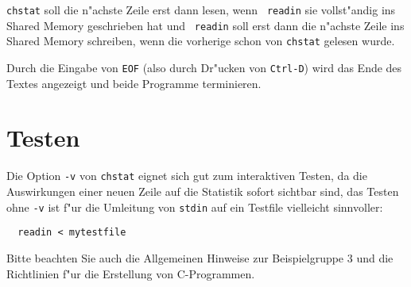 \documentclass{article}
\begin{document}
{\tt chstat} soll die n"achste Zeile erst dann lesen, wenn {\tt
readin} sie vollst"andig ins Shared Memory geschrieben hat und {\tt
readin} soll erst dann die n"achste Zeile ins Shared Memory schreiben,
wenn die vorherige schon von {\tt chstat} gelesen wurde.

Durch die Eingabe von {\tt EOF} (also durch Dr"ucken von {\tt Ctrl-D})
wird das Ende des Textes angezeigt und beide Programme terminieren.



\section*{Testen}

Die Option {\tt -v} von {\tt chstat} eignet sich gut zum interaktiven
Testen, da die Auswirkungen einer neuen Zeile auf die Statistik sofort
sichtbar sind, das Testen ohne {\tt -v} ist f"ur die Umleitung von
{\tt stdin} auf ein Testfile vielleicht sinnvoller:
\begin{verbatim}
  readin < mytestfile
\end{verbatim}

Bitte beachten Sie auch die Allgemeinen Hinweise zur Beispielgruppe 3
und die Richtlinien f"ur die Erstellung von C-Programmen.
\end{document}
